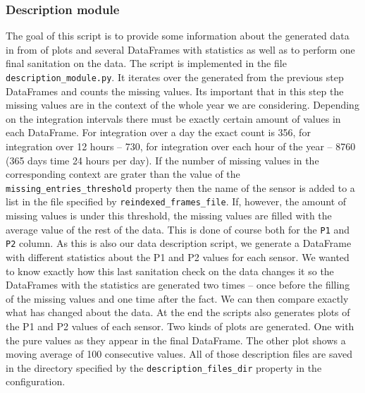 \documentclass[12pt,a4paper,twoside]{scrartcl}
\numberwithin{equation}{section}
\begin{document}
\subsubsection{Description module}\label{sec:desc-module}
The goal of this script is to provide some information about the generated data in from of plots and several DataFrames with statistics as well as to perform one final sanitation on the data. The script is implemented in the file \texttt{description\_module.py}. It iterates over the generated from the previous step DataFrames and counts the missing values. Its important that in this step the missing values are in the context of the whole year we are considering. Depending on the integration intervals there must be exactly certain amount of values in each DataFrame. For integration over a day the exact count is 356, for integration over 12 hours -- 730, for integration over each hour of the year -- 8760 (365 days time 24 hours per day). If the number of missing values in the corresponding context are grater than the value of the \texttt{missing\_entries\_threshold} property then the name of the sensor is added to a list in the file specified by \texttt{reindexed\_frames\_file}. If, however, the amount of missing values is under this threshold, the missing values are filled with the average value of the rest of the data. This is done of course both for the \texttt{P1} and \texttt{P2} column. As this is also our data description script, we generate a DataFrame with different statistics about the P1 and P2 values for each sensor. We wanted to know exactly how this last sanitation check on the data changes it so the DataFrames with the statistics are generated two times -- once before the filling of the missing values and one time after the fact. We can then compare exactly what has changed about the data. At the end the scripts also generates plots of the P1 and P2 values of each sensor. Two kinds of plots are generated. One with the pure values as they appear in the final DataFrame. The other plot shows a moving average of 100 consecutive values. All of those description files are saved in the directory specified by the \texttt{description\_files\_dir} property in the configuration.
\end{document}
